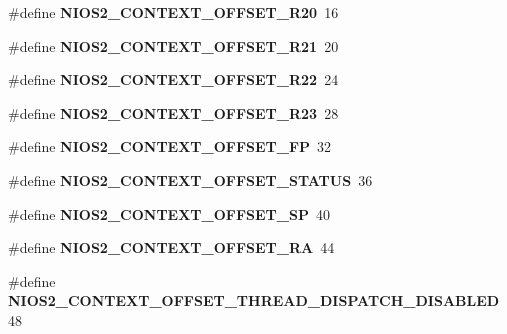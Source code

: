\begin{DoxyCompactItemize}
\item 
\mbox{\label{nios2-utility_8h_ab9e086d7a0c2d023fd2f5031b47ce696}} 
\#define {\bfseries N\+I\+O\+S2\+\_\+\+C\+O\+N\+T\+E\+X\+T\+\_\+\+O\+F\+F\+S\+E\+T\+\_\+\+R20}~16
\item 
\mbox{\label{nios2-utility_8h_a0e8a757f4f3a70c191599b2364fb970f}} 
\#define {\bfseries N\+I\+O\+S2\+\_\+\+C\+O\+N\+T\+E\+X\+T\+\_\+\+O\+F\+F\+S\+E\+T\+\_\+\+R21}~20
\item 
\mbox{\label{nios2-utility_8h_abeccaf3702e0486155bfeae1de8a5083}} 
\#define {\bfseries N\+I\+O\+S2\+\_\+\+C\+O\+N\+T\+E\+X\+T\+\_\+\+O\+F\+F\+S\+E\+T\+\_\+\+R22}~24
\item 
\mbox{\label{nios2-utility_8h_a223f3e694798cc354685813a413aac15}} 
\#define {\bfseries N\+I\+O\+S2\+\_\+\+C\+O\+N\+T\+E\+X\+T\+\_\+\+O\+F\+F\+S\+E\+T\+\_\+\+R23}~28
\item 
\mbox{\label{nios2-utility_8h_ad83825078cf7b5815a818fcc3b55d969}} 
\#define {\bfseries N\+I\+O\+S2\+\_\+\+C\+O\+N\+T\+E\+X\+T\+\_\+\+O\+F\+F\+S\+E\+T\+\_\+\+FP}~32
\item 
\mbox{\label{nios2-utility_8h_a49b6b4edb887c82bb19e4ec2bcab76fc}} 
\#define {\bfseries N\+I\+O\+S2\+\_\+\+C\+O\+N\+T\+E\+X\+T\+\_\+\+O\+F\+F\+S\+E\+T\+\_\+\+S\+T\+A\+T\+US}~36
\item 
\mbox{\label{nios2-utility_8h_a3fb05d0cce8214ccfebccc1a50c7b4c9}} 
\#define {\bfseries N\+I\+O\+S2\+\_\+\+C\+O\+N\+T\+E\+X\+T\+\_\+\+O\+F\+F\+S\+E\+T\+\_\+\+SP}~40
\item 
\mbox{\label{nios2-utility_8h_a837f2be02d21de7277418ee4ed68c55b}} 
\#define {\bfseries N\+I\+O\+S2\+\_\+\+C\+O\+N\+T\+E\+X\+T\+\_\+\+O\+F\+F\+S\+E\+T\+\_\+\+RA}~44
\item 
\mbox{\label{nios2-utility_8h_ac84e7b911a2a11aa05d70101aaca5611}} 
\#define {\bfseries N\+I\+O\+S2\+\_\+\+C\+O\+N\+T\+E\+X\+T\+\_\+\+O\+F\+F\+S\+E\+T\+\_\+\+T\+H\+R\+E\+A\+D\+\_\+\+D\+I\+S\+P\+A\+T\+C\+H\+\_\+\+D\+I\+S\+A\+B\+L\+ED}~48
\item 

\end{DoxyCompactItemize}
